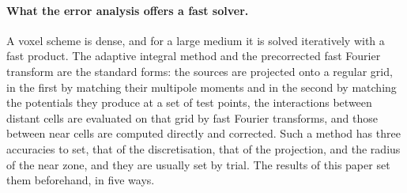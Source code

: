 \documentclass[11pt,a4paper]{article}
\begin{document}
\paragraph{What the error analysis offers a fast solver.} A voxel scheme is dense, and for a large
medium it is solved iteratively with a fast product. The adaptive integral method
\citep{Bleszynski1996} and the precorrected fast Fourier transform \citep{Phillips1997} are the
standard forms: the sources are projected onto a regular grid, in the first by matching their multipole
moments and in the second by matching the potentials they produce at a set of test points, the
interactions between distant cells are evaluated on that grid by fast Fourier transforms, and those
between near cells are computed directly and corrected. Such a method has three accuracies to set, that
of the discretisation, that of the projection, and the radius of the near zone, and they are usually
set by trial. The results of this paper set them beforehand, in five ways.
\end{document}
